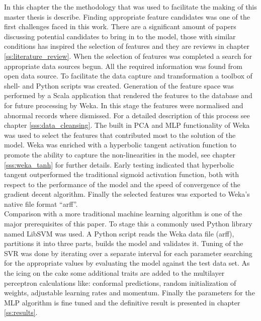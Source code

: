 In this chapter the the methodology that was used to facilitate the making of this master thesis is describe. 
Finding appropriate feature candidates was one of the first challenges faced in this work. There are a significant amount of papers discussing potential candidates to bring in to the model, those with similar conditions has inspired the selection of features and they are reviews in chapter \ref{ss:literature_review}. When the selection of features was completed a search for appropriate data sources begun. All the required information was found from open data source. To facilitate the data capture and transformation a toolbox of shell- and Python scripts was created. Generation of the feature space was performed by a Scala application that rendered the features to the database and for future processing by Weka. In this stage the features were normalised and abnormal records where dismissed. For a detailed description of this process see chapter \ref{sss:data_cleansing}. The built in PCA and MLP functionality of Weka was used to select the features that contributed most to the solution of the model. Weka was enriched with a hyperbolic tangent activation function to promote the ability to capture the non-linearities in the model, see chapter \ref{sss:weka_tanh} for further details. Early testing indicated that hyperbolic tangent outperformed the traditional sigmoid activation function, both with respect to the performance of the model and the speed of convergence of the gradient decent algorithm. Finally the selected features was exported to Weka's native file format ``arff''.
\\
Comparison with a more traditional machine learning algorithm is one of the major prerequisites of this paper. To stage this a commonly used Python library named LibSVM was used. A Python script reads the Weka data file (arff), partitions it into three parts, builds the model and validates it. Tuning of the SVR was done by iterating over a separate interval for each parameter searching for the appropriate values by evaluating the model against the test data set. As the icing on the cake some additional traits are added to the multilayer perceptron calculations like: conformal predictions, random initialization of weights, adjustable learning rates and momentum. Finally the parameters for the MLP algorithm is fine tuned and the definitive result is presented in chapter \ref{ss:results}.  
\\

